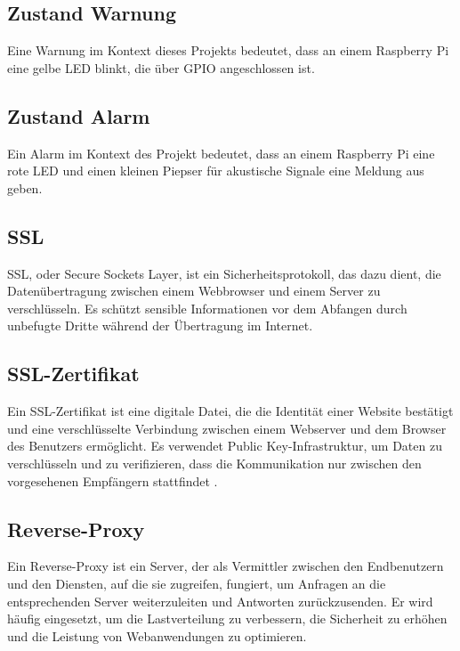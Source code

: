 \subsection{Zustand Warnung }
\label{subsec:warnung}
Eine Warnung im Kontext dieses Projekts bedeutet, dass an einem  Raspberry Pi  eine gelbe LED blinkt, die über GPIO angeschlossen ist. 

\subsection{Zustand Alarm}
\label{subsec:alarm}
Ein Alarm im Kontext des Projekt bedeutet, dass an einem Raspberry Pi eine rote LED und  einen kleinen Piepser für akustische Signale eine Meldung aus geben. 


\subsection{SSL}
\label{subsec:ssl}
SSL, oder Secure Sockets Layer, ist ein Sicherheitsprotokoll, das dazu dient, die Datenübertragung zwischen einem Webbrowser und einem Server zu verschlüsseln. Es schützt sensible Informationen vor dem Abfangen durch unbefugte Dritte während der Übertragung im Internet.

\subsection{SSL-Zertifikat}
\label{subsec:sslcertificate}
Ein SSL-Zertifikat ist eine digitale Datei, die die Identität einer Website bestätigt und eine verschlüsselte Verbindung zwischen einem Webserver und dem Browser des Benutzers ermöglicht. Es verwendet Public Key-Infrastruktur, um Daten zu verschlüsseln und zu verifizieren, dass die Kommunikation nur zwischen den vorgesehenen Empfängern stattfindet \cite {SSLcertificate}.

\subsection{Reverse-Proxy}
\label{subsec:reverseproxy}
Ein Reverse-Proxy ist ein Server, der als Vermittler zwischen den Endbenutzern und den Diensten, auf die sie zugreifen, fungiert, um Anfragen an die entsprechenden Server weiterzuleiten und Antworten zurückzusenden. Er wird häufig eingesetzt, um die Lastverteilung zu verbessern, die Sicherheit zu erhöhen und die Leistung von Webanwendungen zu optimieren\cite{Reverseproxy}.

\clearpage
